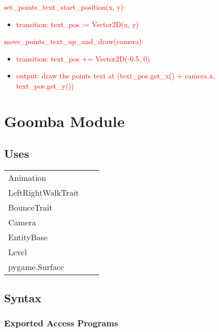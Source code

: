 \documentclass[12pt]{article}
\begin{document}
\noindent \textcolor{red}{set\_points\_text\_start\_position(x, y):}
\begin{itemize}
    \item \textcolor{red}{transition: text\_pos := Vector2D(x, y)}
\end{itemize}

\noindent \textcolor{red}{move\_points\_text\_up\_and\_draw(camera):}
\begin{itemize}
    \item \textcolor{red}{transition: text\_pos += Vector2D(-0.5, 0)}
    \item \textcolor{red}{output: draw the points text at (text\_pos.get\_x() + camera.x, text\_pos.get\_y())}
\end{itemize}

\newpage

\section*{Goomba Module}

\subsection* {Uses}

\begin{tabular}{lll}
    Animation & & \\
    \color{red}LeftRightWalkTrait & &\\
    \color{red}BounceTrait & &\\ 
    Camera & & \\
    EntityBase & & \\
    Level & & \\
    pygame.Surface & & \\
\end{tabular}

\subsection* {Syntax}

\subsubsection* {Exported Access Programs}
\end{document}
